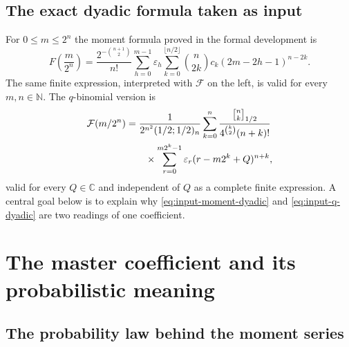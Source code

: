 \documentclass[11pt,oneside]{article}
\theoremstyle{definition}
\theoremstyle{remark}
\newcommand{\C}{\mathbb C}
\newcommand{\N}{\mathbb N}
\newcommand{\qbinom}[3]{\genfrac{[}{]}{0pt}{}{#1}{#2}_{#3}}
\newcommand{\tm}{\varepsilon}
\begin{document}
\subsection{The exact dyadic formula taken as input}

For $0\le m\le2^n$ the moment formula proved in the formal development is
\begin{equation}
 \boxed{
 F\!\left(\frac{m}{2^n}\right)
 =\frac{2^{-\binom{n+1}{2}}}{n!}
 \sum_{h=0}^{m-1}\tm_h
 \sum_{k=0}^{\lfloor n/2\rfloor}
 \binom n{2k}c_k(2m-2h-1)^{n-2k}.}                        \label{eq:input-moment-dyadic}
\end{equation}
The same finite expression, interpreted with $\mathcal F$ on the left, is valid for every
$m,n\in\N$.  The $q$-binomial version is
\begin{align}
 \mathcal F(m/2^n)
 &=\frac{1}{2^{n^2}(1/2;1/2)_n}
 \sum_{k=0}^{n}
 \frac{\qbinom nk{1/2}}{4^{\binom k2}(n+k)!}             \notag\\
 &\qquad\times
 \sum_{r=0}^{m2^k-1}\tm_r(r-m2^k+Q)^{n+k},               \label{eq:input-q-dyadic}
\end{align}
valid for every $Q\in\C$ and independent of $Q$ as a complete finite expression.  A central
goal below is to explain why \eqref{eq:input-moment-dyadic} and
\eqref{eq:input-q-dyadic} are two readings of one coefficient.

\section{The master coefficient and its probabilistic meaning}
\label{sec:master}

\subsection{The probability law behind the moment series}
\end{document}
